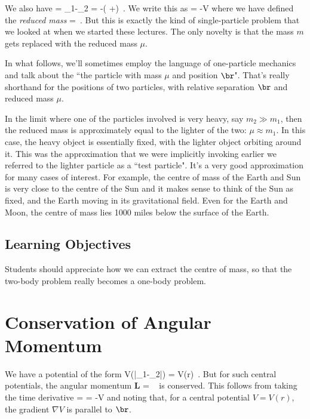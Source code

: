 \para
{\co We also have
%
\be \ddot{\br} = \ddot{\bx}_1-\ddot{\bx}_2 = -\left( +\right)\hat{\br}\ .\label{tomdidthis}\ee
%
We write this as 
%
\be \mu{} = -\nabla V\label{station}\ee
%
where we have defined the {\it reduced mass}
%
\be \mu =\ .\ee
%
}
But this is exactly the kind of single-particle problem that we looked at when we started these lectures.  The only novelty is that the mass $m$ gets replaced with the reduced mass $\mu$. 

\para
In what follows, we'll sometimes employ the language of one-particle mechanics and talk about the ``the particle with mass $\mu$ and  position $\br$". That's really shorthand for the positions of two particles, with relative separation $\br$ and reduced mass $\mu$. 

\para
{\co In the limit where one of the particles involved is very heavy, say $m_2\gg m_1$, then the reduced mass is approximately equal to the lighter of the two: $\mu \approx m_1$. In this case, the heavy object is essentially fixed, with the lighter object orbiting around it.} This was the approximation that we were implicitly invoking earlier we referred to the lighter particle as a ``test particle". It's a very good approximation for many cases of interest. For example, the centre of mass of the Earth and Sun is very close to the centre of the Sun and it makes sense to think of the Sun as fixed, and the Earth moving in its gravitational field.  Even for the Earth and Moon, the centre of mass lies 1000 miles below the surface of the Earth.


\subsection{Learning Objectives}

Students should appreciate how we can extract the centre of mass, so that the two-body problem really becomes a one-body problem. 

\newpage
\section{Conservation of Angular Momentum}

{\co We have a potential of the form
%
\be V(|\bx_1-\bx_2|) = V(r)\ .\ee
%
But for such central potentials, the angular momentum
%
\be 
{\bf L} = \mu\vecr\times\dvecr\ \label{angmom}\ee
%
is conserved. This follows from  taking the time derivative
%
\be {} = \mu\vecr\times\ddvecr =  -\vecr\times \nabla V\ee
%
and noting that, for a central potential $V=V(r)$, the gradient $\nabla V$ is parallel to $\br$.}

